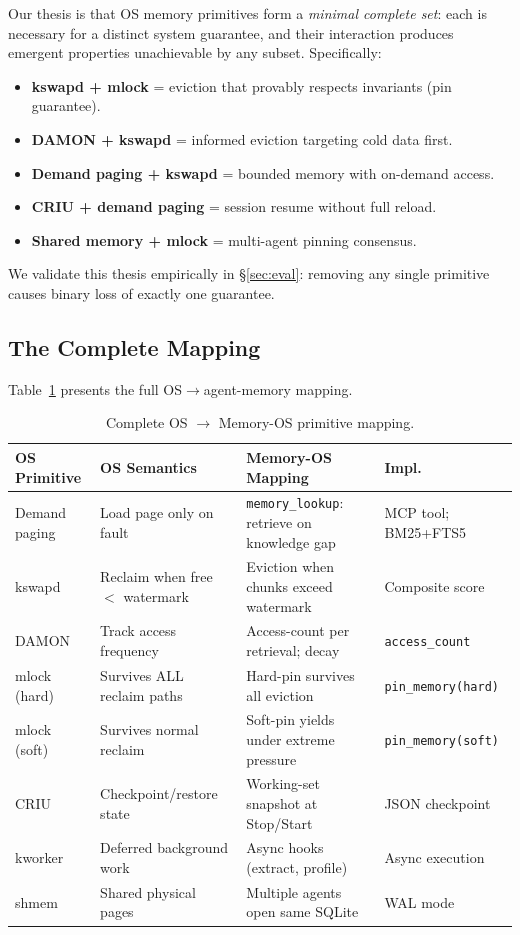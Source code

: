 \documentclass[10pt,twocolumn]{article}
\begin{document}
Our thesis is that OS memory primitives form a \emph{minimal complete set}: each is necessary for a distinct system guarantee, and their interaction produces emergent properties unachievable by any subset. Specifically:
\begin{itemize}[leftmargin=*,nosep]
  \item \textbf{kswapd + mlock} = eviction that provably respects invariants (pin guarantee).
  \item \textbf{DAMON + kswapd} = informed eviction targeting cold data first.
  \item \textbf{Demand paging + kswapd} = bounded memory with on-demand access.
  \item \textbf{CRIU + demand paging} = session resume without full reload.
  \item \textbf{Shared memory + mlock} = multi-agent pinning consensus.
\end{itemize}
We validate this thesis empirically in \S\ref{sec:eval}: removing any single primitive causes binary loss of exactly one guarantee.

\subsection{The Complete Mapping}

Table~\ref{tab:mapping} presents the full OS$\to$agent-memory mapping.

\begin{table}[t]
\centering
\caption{Complete OS $\to$ Memory-OS primitive mapping.}
\label{tab:mapping}
\footnotesize
\begin{tabular}{lp{4.2cm}p{4.8cm}p{3cm}}
\toprule
\textbf{OS Primitive} & \textbf{OS Semantics} & \textbf{Memory-OS Mapping} & \textbf{Impl.} \\
\midrule
Demand paging & Load page only on fault & \texttt{memory\_lookup}: retrieve on knowledge gap & MCP tool; BM25+FTS5 \\
\addlinespace
kswapd & Reclaim when free $<$ watermark & Eviction when chunks exceed watermark & Composite score \\
\addlinespace
DAMON & Track access frequency & Access-count per retrieval; decay & \texttt{access\_count} \\
\addlinespace
mlock (hard) & Survives ALL reclaim paths & Hard-pin survives all eviction & \texttt{pin\_memory(hard)} \\
\addlinespace
mlock (soft) & Survives normal reclaim & Soft-pin yields under extreme pressure & \texttt{pin\_memory(soft)} \\
\addlinespace
CRIU & Checkpoint/restore state & Working-set snapshot at Stop/Start & JSON checkpoint \\
\addlinespace
kworker & Deferred background work & Async hooks (extract, profile) & Async execution \\
\addlinespace
shmem & Shared physical pages & Multiple agents open same SQLite & WAL mode \\
\bottomrule
\end{tabular}
\end{table}
\end{document}
